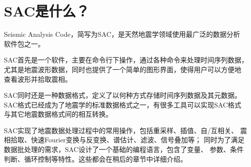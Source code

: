 \section{SAC是什么？}

Seismic Analysis Code，简写为SAC，是天然地震学领域使用最广泛的数据分析
软件包之一。

SAC首先是一个软件，主要在命令行下操作，通过各种命令来处理时间序列数据，
尤其是地震波形数据，同时也提供了一个简单的图形界面，使得用户可以方便地
查看波形并拾取震相。

SAC同时还是一种数据格式，定义了以何种方式存储时间序列数据及其元数据。
SAC格式已经成为了地震学的标准数据格式之一，有很多工具可以实现SAC格式
与其它地震数据格式间的相互转换。

SAC实现了地震数据处理过程中的常用操作，包括重采样、插值、自/互相关、
震相拾取、快速Fourier变换与反变换、谱估计、滤波、信号叠加等；
同时为了满足数据批处理的需求，SAC设计了一个基础的编程语言，包含了变量、
参数、条件判断、循环控制等特性。这些都会在稍后的章节中详细介绍。
